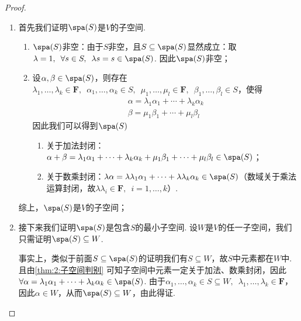 \begin{proof}
    \begin{enumerate}
        \item 首先我们证明$\spa(S)$是$V$的子空间.
              \begin{enumerate}
                  \item $\spa(S)$非空：由于$S$非空，且$S\subseteq\spa(S)$显然成立：取$\lambda=1,\enspace\forall s\in S,\enspace \lambda s=s\in\spa(S)$. 因此$\spa(S)$非空；

                  \item 设$\alpha,\beta\in\spa(S)$，则存在$\lambda_1,\ldots,\lambda_k\in\mathbf{F},\enspace \alpha_1,\ldots,\alpha_k\in S,\enspace\mu_1,\ldots,\mu_l\in\mathbf{F},\enspace\beta_1,\ldots,\beta_l\in S$，使得
                        \begin{gather*}
                            \alpha=\lambda_1\alpha_1+\cdots+\lambda_k\alpha_k \\
                            \beta=\mu_1\beta_1+\cdots+\mu_l\beta_l
                        \end{gather*}
                        因此我们可以得到$\spa(S)$
                        \begin{enumerate}
                            \item 关于加法封闭：$\alpha+\beta=\lambda_1\alpha_1+\cdots+\lambda_k\alpha_k+\mu_1\beta_1+\cdots+\mu_l\beta_l\in\spa(S)$；

                            \item 关于数乘封闭：$\lambda\alpha=\lambda\lambda_1\alpha_1+\cdots+\lambda\lambda_k\alpha_k\in\spa(S)$（数域关于乘法运算封闭，故$\lambda\lambda_i\in\mathbf{F},\enspace i=1,\ldots,k$）.
                        \end{enumerate}
              \end{enumerate}
              综上，$\spa(S)$是$V$的子空间；

        \item 接下来我们证明$\spa(S)$是包含$S$的最小子空间. 设$W$是$V$的任一子空间，我们只需证明$\spa(S)\subseteq W$.

              事实上，类似于前面$S\subseteq\spa(S)$的证明我们有$S\subseteq W$，故$S$中元素都在$W$中. 且由\autoref{thm:2:子空间判别} 可知子空间中元素一定关于加法、数乘封闭，因此$\forall {\alpha}=\lambda_1\alpha_1+\cdots+\lambda_k\alpha_k\in\spa(S)$. 由于$\alpha_1,\ldots,\alpha_k\in S\subseteq W,\enspace\lambda_1,\ldots,\lambda_k\in\mathbf{F}$，因此$\alpha\in W$，从而$\spa(S)\subseteq W$，由此得证.
    \end{enumerate}
\end{proof}

